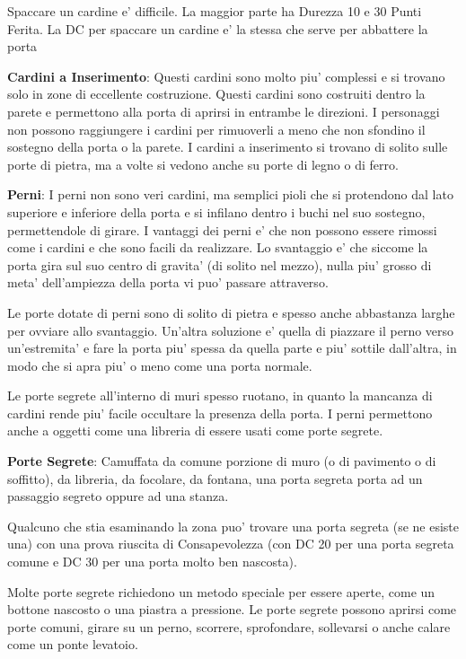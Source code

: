 \documentclass[a4paper,11pt,twoside,openany]{book}
\begin{document}
{		Spaccare un cardine e' difficile. La maggior parte ha Durezza 10 e 30 Punti Ferita. La DC per spaccare un cardine e' la stessa che serve per abbattere la porta
		
		\textbf{Cardini a Inserimento}: Questi cardini sono molto piu' complessi e si trovano solo in zone di eccellente costruzione. Questi cardini sono costruiti dentro la parete e permettono alla porta di aprirsi in entrambe le direzioni. I personaggi non possono raggiungere i cardini per rimuoverli a meno che non sfondino il sostegno della porta o la parete. I cardini a inserimento si trovano di solito sulle porte di pietra, ma a volte si vedono anche su porte di legno o di ferro.
		
		\textbf{Perni}: I perni non sono veri cardini, ma semplici pioli che si protendono dal lato superiore e inferiore della porta e si infilano dentro i buchi nel suo sostegno, permettendole di girare. I vantaggi dei perni e' che non possono essere rimossi come i cardini e che sono facili da realizzare. Lo svantaggio e' che siccome la porta gira sul suo centro di gravita' (di solito nel mezzo), nulla piu' grosso di meta' dell'ampiezza della porta vi puo' passare attraverso.
		
		Le porte dotate di perni sono di solito di pietra e spesso anche abbastanza larghe per ovviare allo svantaggio. Un'altra soluzione e' quella di piazzare il perno verso un'estremita' e fare la porta piu' spessa da quella parte e piu' sottile dall'altra, in modo che si apra piu' o meno come una porta normale.
		
		Le porte segrete all'interno di muri spesso ruotano, in quanto la mancanza di cardini rende piu' facile occultare la presenza della porta. I perni permettono anche a oggetti come una libreria di essere usati come porte segrete.
		
		\textbf{Porte Segrete}: Camuffata da comune porzione di muro (o di pavimento o di soffitto), da libreria, da focolare, da fontana, una porta segreta porta ad un passaggio segreto oppure ad una stanza.
		
		Qualcuno che stia esaminando la zona puo' trovare una porta segreta (se ne esiste una) con una prova riuscita di Consapevolezza (con DC 20 per una porta segreta comune e DC 30 per una porta molto ben nascosta).
		
		Molte porte segrete richiedono un metodo speciale per essere aperte, come un bottone nascosto o una piastra a pressione. Le porte segrete possono aprirsi come porte comuni, girare su un perno, scorrere, sprofondare, sollevarsi o anche calare come un ponte levatoio.
		
}
\end{document}

